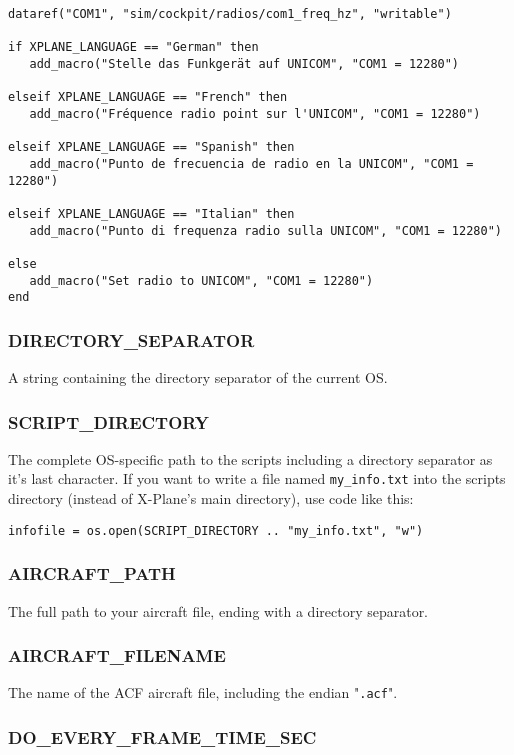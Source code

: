 \documentclass[11pt,parskip=half,a4paper]{scrartcl}
\begin{document}
\begin{lstlisting}
dataref("COM1", "sim/cockpit/radios/com1_freq_hz", "writable")

if XPLANE_LANGUAGE == "German" then
   add_macro("Stelle das Funkgerät auf UNICOM", "COM1 = 12280")

elseif XPLANE_LANGUAGE == "French" then
   add_macro("Fréquence radio point sur l'UNICOM", "COM1 = 12280")

elseif XPLANE_LANGUAGE == "Spanish" then
   add_macro("Punto de frecuencia de radio en la UNICOM", "COM1 = 12280")

elseif XPLANE_LANGUAGE == "Italian" then
   add_macro("Punto di frequenza radio sulla UNICOM", "COM1 = 12280")

else
   add_macro("Set radio to UNICOM", "COM1 = 12280")
end
\end{lstlisting}

\subsubsection{DIRECTORY\_SEPARATOR}

A string containing the directory separator of the current OS.

\subsubsection{SCRIPT\_DIRECTORY}

The complete OS-specific path to the scripts including a directory separator as it's last character. If you want to write a file named \verb|my_info.txt| into the scripts directory (instead of X-Plane's main directory), use code like this:

\verb|infofile = os.open(SCRIPT_DIRECTORY .. "my_info.txt", "w")|

\subsubsection{AIRCRAFT\_PATH}

The full path to your aircraft file, ending with a directory separator.

\subsubsection{AIRCRAFT\_FILENAME}

The name of the ACF aircraft file, including the endian "\verb|.acf|".

\subsubsection{DO\_EVERY\_FRAME\_TIME\_SEC}
\end{document}
